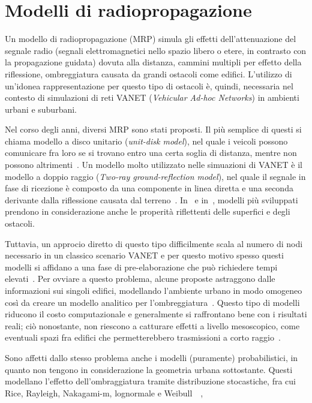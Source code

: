 \section{Modelli di radiopropagazione}
Un modello di radiopropagazione (MRP) simula gli effetti dell'attenuazione del segnale radio (segnali elettromagnetici nello spazio libero o etere, in contrasto con la propagazione guidata)
dovuta alla distanza, cammini multipli per effetto della riflessione, ombreggiatura causata da grandi ostacoli come edifici.
L'utilizzo di un'idonea rappresentazione per questo tipo di ostacoli è, quindi, necessaria nel contesto di simulazioni di reti VANET (\textit{Vehicular Ad-hoc Networks}) in ambienti urbani
e suburbani.

Nel corso degli anni, diversi MRP sono stati proposti.
Il più semplice di questi si chiama modello a disco unitario (\textit{unit-disk model}), nel quale i veicoli possono comunicare fra loro se si trovano entro una certa soglia
di distanza, mentre non possono altrimenti~\cite{6554832}.
Un modello molto utilizzato nelle simuazioni di VANET è il modello a doppio raggio (\textit{Two-ray ground-reflection model}),
nel quale il segnale in fase di ricezione è composto da una componente in linea diretta e una seconda derivante dalla riflessione causata dal terreno~\cite{DBLP:books/daglib/0091821}.
In~\cite{Schmitz:2006:ERW:1164717.1164730} e in~\cite{Souley2005RealisticUS}, modelli più sviluppati prendono in considerazione anche le properità riflettenti delle superfici e degli ostacoli.

Tuttavia, un approcio diretto di questo tipo difficilmente scala al numero di nodi necessario in un classico scenario VANET e per questo motivo
spesso questi modelli si affidano a una fase di pre-elaborazione che può richiedere tempi elevati~\cite{Stepanov:2008:IMR:1293378.1293656}.
Per ovviare a questo problema, alcune proposte astraggono dalle informazioni sui singoli edifici, modellando l'ambiente urbano in modo omogeneo
così da creare un modello analitico per l'ombreggiatura~\cite{1492678}.
Questo tipo di modelli riducono il costo computazionale e generalmente si raffrontano bene con i risultati reali;
ciò nonostante, non riescono a catturare effetti a livello mesoscopico, come eventuali spazi fra edifici che permetterebbero trasmissioni a corto raggio~\cite{Giordano:2010:CST:1860058.1860065}.

Sono affetti dallo stesso problema anche i modelli (puramente) probabilistici, in quanto non tengono in considerazione la geometria urbana sottostante.
Questi modellano l'effetto dell'ombraggiatura tramite distribuzione stocastiche, fra cui Rice, Rayleigh, Nakagami-m, lognormale e Weibull~\cite{6554832}~\cite{Rappaport:2001:WCP:559977},
%
